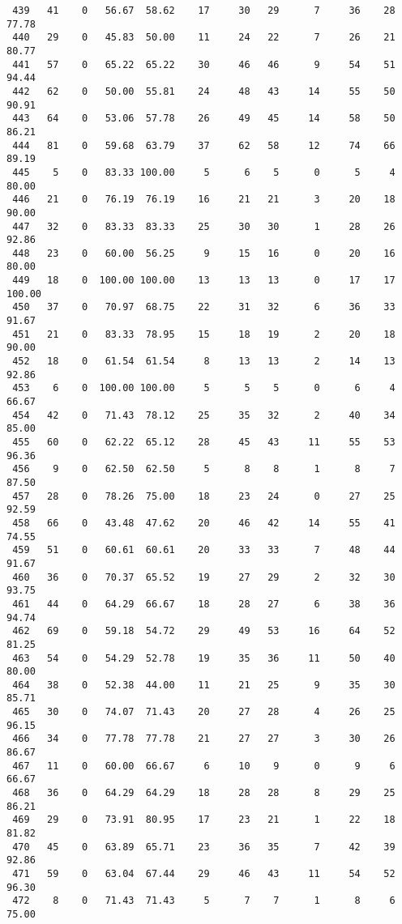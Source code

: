 \begin{verbatim}
 439   41    0   56.67  58.62    17     30   29      7     36    28    77.78
 440   29    0   45.83  50.00    11     24   22      7     26    21    80.77
 441   57    0   65.22  65.22    30     46   46      9     54    51    94.44
 442   62    0   50.00  55.81    24     48   43     14     55    50    90.91
 443   64    0   53.06  57.78    26     49   45     14     58    50    86.21
 444   81    0   59.68  63.79    37     62   58     12     74    66    89.19
 445    5    0   83.33 100.00     5      6    5      0      5     4    80.00
 446   21    0   76.19  76.19    16     21   21      3     20    18    90.00
 447   32    0   83.33  83.33    25     30   30      1     28    26    92.86
 448   23    0   60.00  56.25     9     15   16      0     20    16    80.00
 449   18    0  100.00 100.00    13     13   13      0     17    17   100.00
 450   37    0   70.97  68.75    22     31   32      6     36    33    91.67
 451   21    0   83.33  78.95    15     18   19      2     20    18    90.00
 452   18    0   61.54  61.54     8     13   13      2     14    13    92.86
 453    6    0  100.00 100.00     5      5    5      0      6     4    66.67
 454   42    0   71.43  78.12    25     35   32      2     40    34    85.00
 455   60    0   62.22  65.12    28     45   43     11     55    53    96.36
 456    9    0   62.50  62.50     5      8    8      1      8     7    87.50
 457   28    0   78.26  75.00    18     23   24      0     27    25    92.59
 458   66    0   43.48  47.62    20     46   42     14     55    41    74.55
 459   51    0   60.61  60.61    20     33   33      7     48    44    91.67
 460   36    0   70.37  65.52    19     27   29      2     32    30    93.75
 461   44    0   64.29  66.67    18     28   27      6     38    36    94.74
 462   69    0   59.18  54.72    29     49   53     16     64    52    81.25
 463   54    0   54.29  52.78    19     35   36     11     50    40    80.00
 464   38    0   52.38  44.00    11     21   25      9     35    30    85.71
 465   30    0   74.07  71.43    20     27   28      4     26    25    96.15
 466   34    0   77.78  77.78    21     27   27      3     30    26    86.67
 467   11    0   60.00  66.67     6     10    9      0      9     6    66.67
 468   36    0   64.29  64.29    18     28   28      8     29    25    86.21
 469   29    0   73.91  80.95    17     23   21      1     22    18    81.82
 470   45    0   63.89  65.71    23     36   35      7     42    39    92.86
 471   59    0   63.04  67.44    29     46   43     11     54    52    96.30
 472    8    0   71.43  71.43     5      7    7      1      8     6    75.00

\end{verbatim}
